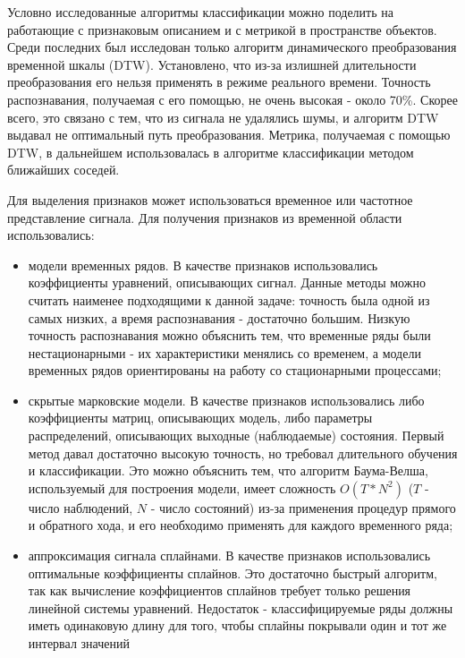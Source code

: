 Условно исследованные алгоритмы классификации можно поделить на работающие с признаковым описанием и с метрикой в пространстве объектов. Среди последних был исследован только алгоритм динамического преобразования временной шкалы (DTW). Установлено, что из-за излишней длительности преобразования его нельзя применять в режиме реального времени. Точность распознавания, получаемая с его помощью, не очень высокая - около 70\%. Скорее всего, это связано с тем, что из сигнала не удалялись шумы, и алгоритм DTW выдавал не оптимальный путь преобразования. Метрика, получаемая с помощью DTW, в дальнейшем использовалась в алгоритме классификации методом ближайших соседей.

Для выделения признаков может использоваться временное или частотное представление сигнала. Для получения признаков из временной области использовались:
\begin{itemize}
\item модели временных рядов. В качестве признаков использовались коэффициенты уравнений, описывающих сигнал. Данные методы можно считать наименее подходящими к данной задаче: точность была одной из самых низких, а время распознавания - достаточно большим. Низкую точность распознавания можно объяснить тем, что временные ряды были нестационарными - их характеристики менялись со временем, а модели временных рядов ориентированы на работу со стационарными процессами;
\item скрытые марковские модели. В качестве признаков использовались либо коэффициенты матриц, описывающих модель, либо параметры распределений, описывающих выходные (наблюдаемые) состояния. Первый метод давал достаточно высокую точность, но требовал длительного обучения и классификации. Это можно объяснить тем, что алгоритм Баума-Велша, используемый для построения модели, имеет сложность $O(T*N^2)$ ($T$ - число наблюдений, $N$ - число состояний) из-за применения процедур прямого и обратного хода, и его необходимо применять для каждого временного ряда;
\item аппроксимация сигнала сплайнами. В качестве признаков использовались оптимальные коэффициенты сплайнов. Это достаточно быстрый алгоритм, так как вычисление коэффициентов сплайнов требует только решения линейной системы уравнений. Недостаток - классифицируемые ряды должны иметь одинаковую длину для того, чтобы сплайны покрывали один и тот же интервал значений
\end{itemize}

